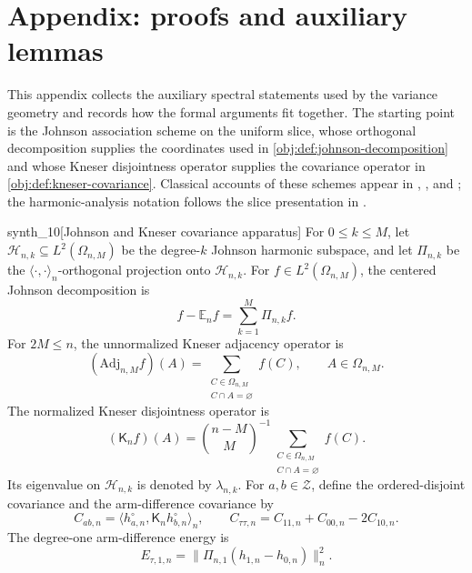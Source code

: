 \section{Appendix: proofs and auxiliary lemmas}\label{sec:appendix}

This appendix collects the auxiliary spectral statements used by the variance geometry and records how the formal arguments fit together. The starting point is the Johnson association scheme on the uniform slice, whose orthogonal decomposition supplies the coordinates used in \cref{obj:def:johnson-decomposition} and whose Kneser disjointness operator supplies the covariance operator in \cref{obj:def:kneser-covariance}. Classical accounts of these schemes appear in \citet{Delsarte1973}, \citet{BrouwerCohenNeumaier1989}, and \citet{BrouwerEtAl2018}; the harmonic-analysis notation follows the slice presentation in \citet{Filmus2016}.

\begin{definitionv}{synth_10}[Johnson and Kneser covariance apparatus]
For \(0\le k\le M\), let \(\mathcal H_{n,k}\subseteq L^2(\Omega_{n,M})\) be the degree-\(k\) Johnson harmonic subspace, and let \(\Pi_{n,k}\) be the \(\langle\cdot,\cdot\rangle_n\)-orthogonal projection onto \(\mathcal H_{n,k}\). For \(f\in L^2(\Omega_{n,M})\), the centered Johnson decomposition is
\[
f-\mathbb E_n f=\sum_{k=1}^M\Pi_{n,k}f.
\]
For \(2M\le n\), the unnormalized Kneser adjacency operator is
\[
(\mathrm{Adj}_{n,M}f)(A)=\sum_{\substack{C\in\Omega_{n,M}\\ C\cap A=\varnothing}} f(C),
\qquad A\in\Omega_{n,M}.
\]
The normalized Kneser disjointness operator is
\[
(\mathsf K_n f)(A)=\binom{n-M}{M}^{-1}
\sum_{\substack{C\in\Omega_{n,M}\\ C\cap A=\varnothing}} f(C).
\]
Its eigenvalue on \(\mathcal H_{n,k}\) is denoted by \(\lambda_{n,k}\). For \(a,b\in\mathcal Z\), define the ordered-disjoint covariance and the arm-difference covariance by
\[
C_{ab,n}=\langle h_{a,n}^{\circ},\mathsf K_n h_{b,n}^{\circ}\rangle_n,\qquad
C_{\tau\tau,n}=C_{11,n}+C_{00,n}-2C_{10,n}.
\]
The degree-one arm-difference energy is
\[
E_{\tau,1,n}=\|\Pi_{n,1}(h_{1,n}-h_{0,n})\|_n^2.
\]
\end{definitionv}

